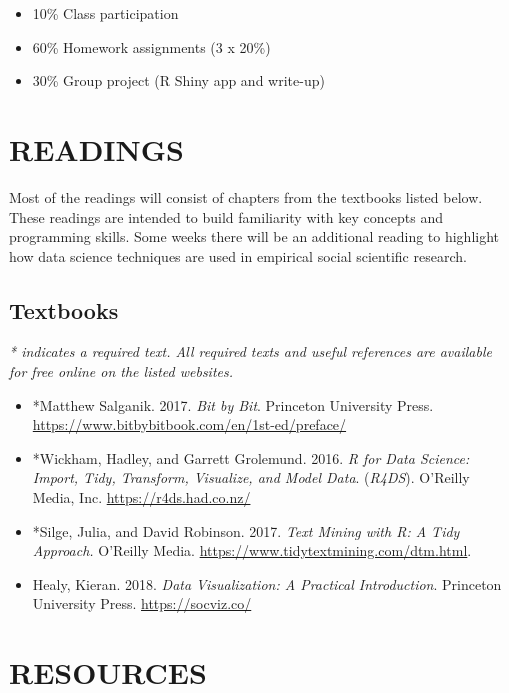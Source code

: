 \documentclass[
  10pt,
]{article}
\providecommand{\tightlist}{%
  \setlength{\itemsep}{0pt}\setlength{\parskip}{0pt}}
\begin{document}
\begin{itemize}
\tightlist
\item
  10\% Class participation
\item
  60\% Homework assignments (3 x 20\%)
\item
  30\% Group project (R Shiny app and write-up)
\end{itemize}

\hypertarget{readings}{%
\section{READINGS}\label{readings}}

Most of the readings will consist of chapters from the textbooks listed
below. These readings are intended to build familiarity with key
concepts and programming skills. Some weeks there will be an additional
reading to highlight how data science techniques are used in empirical
social scientific research.

\hypertarget{textbooks}{%
\subsection{Textbooks}\label{textbooks}}

\emph{* indicates a required text. All required texts and useful
references are available for free online on the listed websites.}

\begin{itemize}
\tightlist
\item
  *Matthew Salganik. 2017. \emph{Bit by Bit}. Princeton University
  Press. \url{https://www.bitbybitbook.com/en/1st-ed/preface/}
\item
  *Wickham, Hadley, and Garrett Grolemund. 2016. \emph{R for Data
  Science: Import, Tidy, Transform, Visualize, and Model Data}.
  (\emph{R4DS}). O'Reilly Media, Inc. \url{https://r4ds.had.co.nz/}
\item
  *Silge, Julia, and David Robinson. 2017. \emph{Text Mining with R: A
  Tidy Approach.} O'Reilly Media.
  \url{https://www.tidytextmining.com/dtm.html}.
\item
  Healy, Kieran. 2018. \emph{Data Visualization: A Practical
  Introduction}. Princeton University Press. \url{https://socviz.co/}
\end{itemize}

\hypertarget{resources}{%
\section{RESOURCES}\label{resources}}
\end{document}
